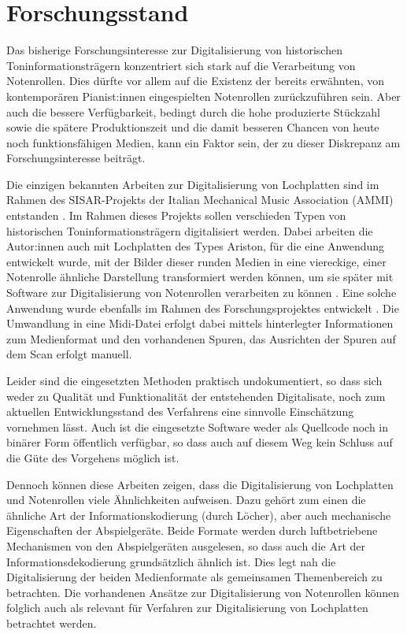 \section{Forschungsstand} \label{Forschungsstand}

Das bisherige Forschungsinteresse zur Digitalisierung von historischen Toninformationsträgern konzentriert sich stark auf die Verarbeitung von Notenrollen.
Dies dürfte vor allem auf die Existenz der bereits erwähnten, von kontemporären Pianist:innen eingespielten Notenrollen zurückzuführen sein.
Aber auch die bessere Verfügbarkeit, bedingt durch die hohe produzierte Stückzahl sowie die spätere Produktionszeit und die damit besseren Chancen von heute noch funktionsfähigen Medien, kann ein Faktor sein, der zu dieser Diskrepanz am Forschungsinteresse beiträgt.

Die einzigen bekannten Arbeiten zur Digitalisierung von Lochplatten sind im Rahmen des SISAR-Projekts der Italian Mechanical Music Association (AMMI) entstanden \parencite[]{pedrazzini_2013,perretti_2014}.
Im Rahmen dieses Projekts sollen verschieden Typen von historischen Toninformationsträgern digitalisiert werden.
Dabei arbeiten die Autor:innen auch mit Lochplatten des Types Ariston, für die eine Anwendung entwickelt wurde, mit der Bilder dieser runden Medien in eine viereckige, einer Notenrolle ähnliche Darstellung transformiert werden können, um sie später mit Software zur Digitalisierung von Notenrollen verarbeiten zu können \parencite[]{perretti_2014}.
Eine solche Anwendung wurde ebenfalls im Rahmen des Forschungsprojektes entwickelt \parencite[]{conversion}.
Die Umwandlung in eine Midi-Datei erfolgt dabei mittels hinterlegter Informationen zum Medienformat und den vorhandenen Spuren, das Ausrichten der Spuren auf dem Scan erfolgt manuell.

Leider sind die eingesetzten Methoden praktisch undokumentiert, so dass sich weder zu Qualität und Funktionalität der entstehenden Digitalisate, noch zum aktuellen Entwicklungsstand des Verfahrens eine sinnvolle Einschätzung vornehmen lässt.
Auch ist die eingesetzte Software weder als Quellcode noch in binärer Form öffentlich verfügbar, so dass auch auf diesem Weg kein Schluss auf die Güte des Vorgehens möglich ist.

Dennoch können diese Arbeiten zeigen, dass die Digitalisierung von Lochplatten und Notenrollen viele Ähnlichkeiten aufweisen.
Dazu gehört zum einen die ähnliche Art der Informationskodierung (durch Löcher), aber auch mechanische Eigenschaften der Abspielgeräte.
Beide Formate werden durch luftbetriebene Mechanismen von den Abspielgeräten ausgelesen, so dass auch die Art der Informationsdekodierung grundsätzlich ähnlich ist.
Dies legt nah die Digitalisierung der beiden Medienformate als gemeinsamen Themenbereich zu betrachten.
Die vorhandenen Ansätze zur Digitalisierung von Notenrollen können folglich auch als relevant für Verfahren zur Digitalisierung von Lochplatten betrachtet werden.

